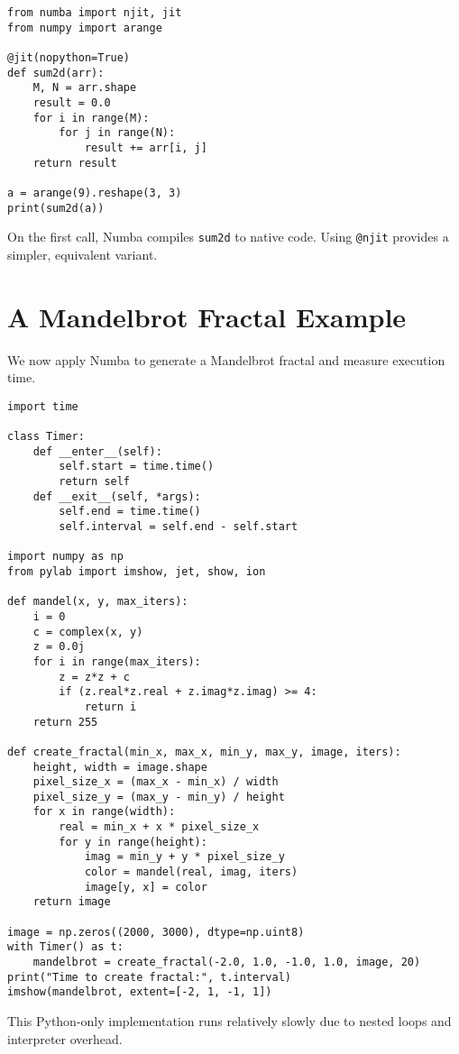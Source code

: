\documentclass[11pt,a4paper]{book}
\begin{document}
\begin{lstlisting}
from numba import njit, jit
from numpy import arange

@jit(nopython=True)
def sum2d(arr):
    M, N = arr.shape
    result = 0.0
    for i in range(M):
        for j in range(N):
            result += arr[i, j]
    return result

a = arange(9).reshape(3, 3)
print(sum2d(a))
\end{lstlisting}

On the first call, Numba compiles \texttt{sum2d} to native code. Using \texttt{@njit} provides a simpler, equivalent variant.

\section{A Mandelbrot Fractal Example}
We now apply Numba to generate a Mandelbrot fractal and measure execution time.

\begin{lstlisting}
import time

class Timer:
    def __enter__(self):
        self.start = time.time()
        return self
    def __exit__(self, *args):
        self.end = time.time()
        self.interval = self.end - self.start

import numpy as np
from pylab import imshow, jet, show, ion

def mandel(x, y, max_iters):
    i = 0
    c = complex(x, y)
    z = 0.0j
    for i in range(max_iters):
        z = z*z + c
        if (z.real*z.real + z.imag*z.imag) >= 4:
            return i
    return 255

def create_fractal(min_x, max_x, min_y, max_y, image, iters):
    height, width = image.shape
    pixel_size_x = (max_x - min_x) / width
    pixel_size_y = (max_y - min_y) / height
    for x in range(width):
        real = min_x + x * pixel_size_x
        for y in range(height):
            imag = min_y + y * pixel_size_y
            color = mandel(real, imag, iters)
            image[y, x] = color
    return image

image = np.zeros((2000, 3000), dtype=np.uint8)
with Timer() as t:
    mandelbrot = create_fractal(-2.0, 1.0, -1.0, 1.0, image, 20)
print("Time to create fractal:", t.interval)
imshow(mandelbrot, extent=[-2, 1, -1, 1])
\end{lstlisting}

This Python-only implementation runs relatively slowly due to nested loops and interpreter overhead.
\end{document}
